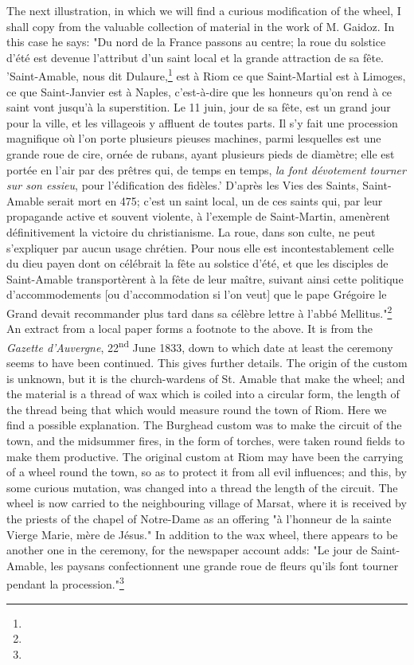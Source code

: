 \documentclass[a4paper, 11pt, oneside, polutonikogreek, english]{article}
\begin{document}
The next illustration, in which we will find a curious modification of the wheel, I shall copy from the valuable collection of material in the work of M. Gaidoz. In this case he says: "Du nord de la France passons au centre; la roue du solstice d'été est devenue l'attribut d'un saint local et la grande attraction de sa fête. 'Saint-Amable, nous dit Dulaure,\footnote{} est à Riom ce que Saint-Martial est à Limoges, ce que Saint-Janvier est à Naples, c'est-à-dire que les honneurs qu'on rend à ce saint vont jusqu'à la superstition. Le 11 juin, jour de sa fête, est un grand jour pour la ville, et les villageois y affluent de toutes parts. Il s'y fait une procession magnifique où l'on porte plusieurs pieuses machines, parmi lesquelles est une grande roue de cire, ornée de rubans, ayant plusieurs pieds de diamètre; elle est portée en l'air par des prêtres qui, de temps en temps, \emph{la font dévotement tourner sur son essieu}, pour l'édification des fidèles.' D'après les Vies des Saints, Saint-Amable serait mort en 475; c'est un saint local, un de ces saints qui, par leur propagande active et souvent violente, à l'exemple de Saint-Martin, amenèrent définitivement la victoire du christianisme. La roue, dans son culte, ne peut s'expliquer par aucun usage chrétien. Pour nous elle est incontestablement celle du dieu payen dont on célébrait la fête au solstice d'été, et que les disciples de Saint-Amable transportèrent à la fête de leur maître, suivant ainsi cette politique d'accommodements [ou d'accommodation si l'on veut] que le pape Grégoire le Grand devait recommander plus tard dans sa célèbre lettre à l'abbé Mellitus."\footnote{} An extract from a local paper forms a footnote to the above. It is from the \emph{Gazette d'Auvergne}, 22\textsuperscript{nd} June 1833, down to which date at least the ceremony seems to have been continued. This gives further details. The origin of the custom is unknown, but it is the church-wardens of St. Amable that make the wheel; and the material is a thread of wax which is coiled into a circular form, the length of the thread being that which would measure round the town of Riom. Here we find a possible explanation. The Burghead custom was to make the circuit of the town, and the midsummer fires, in the form of torches, were taken round fields to make them productive. The original custom at Riom may have been the carrying of a wheel round the town, so as to protect it from all evil influences; and this, by some curious mutation, was changed into a thread the length of the circuit. The wheel is now carried to the neighbouring village of Marsat, where it is received by the priests of the chapel of Notre-Dame as an offering "à l'honneur de la sainte Vierge Marie, mère de Jésus." In addition to the wax wheel, there appears to be another one in the ceremony, for the newspaper account adds: "Le jour de Saint-Amable, les paysans confectionnent une grande roue de fleurs qu'ils font tourner pendant la procession."\footnote{}
\end{document}
